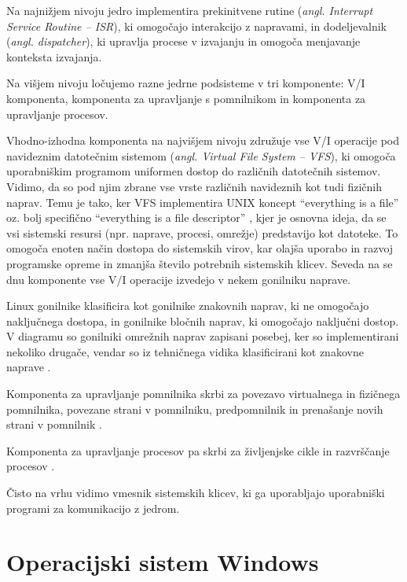 \documentclass[a4paper,12pt,openright]{book}
\begin{document}
Na najnižjem nivoju jedro implementira prekinitvene rutine (\textit{angl. Interrupt Service Routine -- ISR}), ki omogočajo interakcijo z napravami, in dodeljevalnik (\textit{angl. dispatcher}), ki upravlja procese v izvajanju in omogoča menjavanje konteksta izvajanja.

Na višjem nivoju ločujemo razne jedrne podsisteme v tri komponente: V/I komponenta, komponenta za upravljanje s pomnilnikom in komponenta za upravljanje procesov.

Vhodno-izhodna komponenta na najvišjem nivoju združuje vse V/I operacije pod navideznim datotečnim sistemom (\textit{angl. Virtual File System -- VFS}), ki omogoča uporabniškim programom uniformen dostop do različnih datotečnih sistemov.
Vidimo, da so pod njim zbrane vse vrste različnih navideznih kot tudi fizičnih naprav.
Temu je tako, ker VFS implementira UNIX koncept ``everything is a file'' \cite{Garrels_2008} oz. bolj specifično ``everything is a file descriptor'' \cite{LWN_Brown_2010}, kjer je osnovna ideja, da se vsi sistemski resursi (npr. naprave, procesi, omrežje) predstavijo kot datoteke.
To omogoča enoten način dostopa do sistemskih virov, kar olajša uporabo in razvoj programske opreme in zmanjša število potrebnih sistemskih klicev.
Seveda na se dnu komponente vse V/I operacije izvedejo v nekem gonilniku naprave.

Linux gonilnike klasificira kot gonilnike znakovnih naprav, ki ne omogočajo naključnega dostopa, in gonilnike bločnih naprav, ki omogočajo naključni dostop.
V diagramu so gonilniki omrežnih naprav zapisani posebej, ker so implementirani nekoliko drugače, vendar so iz tehničnega vidika klasificirani kot znakovne naprave \cite{Tanenbaum_Bos_2023}.

Komponenta za upravljanje pomnilnika skrbi za povezavo virtualnega in fizičnega pomnilnika, povezane strani v pomnilniku, predpomnilnik in prenašanje novih strani v pomnilnik \cite{Tanenbaum_Bos_2023}.

Komponenta za upravljanje procesov pa skrbi za življenjske cikle in razvrščanje procesov \cite{Tanenbaum_Bos_2023}.

Čisto na vrhu vidimo vmesnik sistemskih klicev, ki ga uporabljajo uporabniški programi za komunikacijo z jedrom.

\section{Operacijski sistem Windows}
\end{document}
